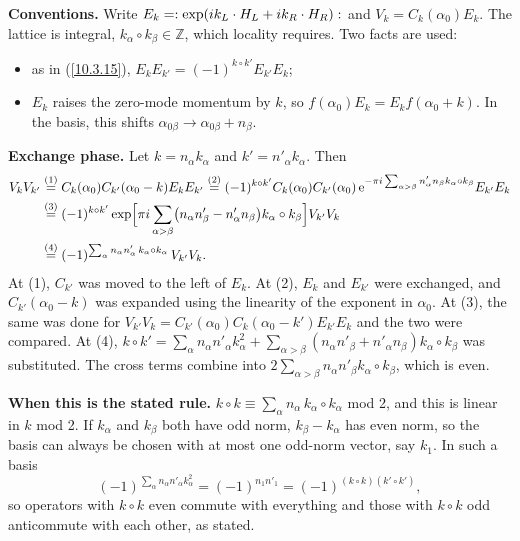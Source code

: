 	\begin{tcolorbox}[breakable]
		\begin{remark}
			\textbf{Conventions.} Write $E_k=\mathrel{:}\exp(i k_L\cdot H_L+i k_R\cdot H_R)\mathrel{:}$ and $V_k=C_k(\alpha_0)E_k$. The lattice is integral, $k_\alpha\circ k_\beta\in\mathds Z$, which locality requires. Two facts are used:
			\begin{itemize}
				\item as in (\ref{10.3.15}), $E_kE_{k'}=(-1)^{k\circ k'}E_{k'}E_k$;
				\item $E_k$ raises the zero-mode momentum by $k$, so $f(\alpha_0)E_k=E_kf(\alpha_0+k)$. In the basis, this shifts $\alpha_{0\beta}\to\alpha_{0\beta}+n_\beta$.
			\end{itemize}
			\textbf{Exchange phase.} Let $k=n_\alpha k_\alpha$ and $k'=n'_\alpha k_\alpha$. Then
			\begin{align*}
				V_kV_{k'}&\overset{(1)}{=}C_k(\alpha_0)C_{k'}(\alpha_0-k)E_kE_{k'}
				\overset{(2)}{=}(-1)^{k\circ k'}C_k(\alpha_0)C_{k'}(\alpha_0)\,\mathrm{e}^{-\pi i\sum_{\alpha>\beta}n'_\alpha n_\beta k_\alpha\circ k_\beta}E_{k'}E_k\\
				&\overset{(3)}{=}(-1)^{k\circ k'}\exp\Bigl[\pi i\sum_{\alpha>\beta}\bigl(n_\alpha n'_\beta-n'_\alpha n_\beta\bigr)k_\alpha\circ k_\beta\Bigr]V_{k'}V_k\\
				&\overset{(4)}{=}(-1)^{\sum_\alpha n_\alpha n'_\alpha\,k_\alpha\circ k_\alpha}\,V_{k'}V_k .
			\end{align*}
			At (1), $C_{k'}$ was moved to the left of $E_k$. At (2), $E_k$ and $E_{k'}$ were exchanged, and $C_{k'}(\alpha_0-k)$ was expanded using the linearity of the exponent in $\alpha_0$. At (3), the same was done for $V_{k'}V_k=C_{k'}(\alpha_0)C_k(\alpha_0-k')E_{k'}E_k$ and the two were compared. At (4), $k\circ k'=\sum_\alpha n_\alpha n'_\alpha k_\alpha^{2}+\sum_{\alpha>\beta}(n_\alpha n'_\beta+n'_\alpha n_\beta)k_\alpha\circ k_\beta$ was substituted. The cross terms combine into $2\sum_{\alpha>\beta}n_\alpha n'_\beta k_\alpha\circ k_\beta$, which is even.

			\textbf{When this is the stated rule.} $k\circ k\equiv\sum_\alpha n_\alpha\,k_\alpha\circ k_\alpha$ mod 2, and this is linear in $k$ mod 2. If $k_\alpha$ and $k_\beta$ both have odd norm, $k_\beta-k_\alpha$ has even norm, so the basis can always be chosen with at most one odd-norm vector, say $k_1$. In such a basis
			\begin{equation*}
				(-1)^{\sum_\alpha n_\alpha n'_\alpha k_\alpha^{2}}=(-1)^{n_1n'_1}=(-1)^{(k\circ k)(k'\circ k')} ,
			\end{equation*}
			so operators with $k\circ k$ even commute with everything and those with $k\circ k$ odd anticommute with each other, as stated.


\end{remark}
\end{tcolorbox}
